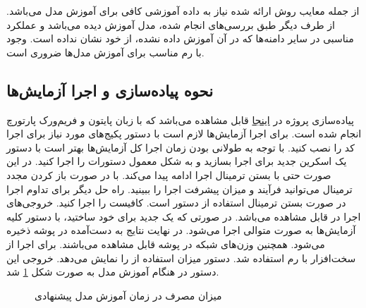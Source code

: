 از جمله معایب روش ارائه شده نیاز به داده آموزشی کافی برای آموزش مدل می‌باشد. از طرف دیگر طبق بررسی‌های انجام شده، مدل آموزش دیده
می‌باشد و عملکرد مناسبی در سایر دامنه‌ها که در آن آموزش داده نشده، از خود نشان نداده است. وجود 
با رم مناسب برای آموزش مدل‌ها ضروری است.



\subsection{نحوه پیاده‌سازی و اجرا آزمایش‌ها}
پیاده‌سازی پروژه در 
\href{https://github.com/ghazaleh-mahmoodi/Climate_Activism_Stance_Detection}{اینجا}
قابل مشاهده می‌باشد که با زبان پایتون و فریم‌ورک پارتورچ انجام شده است. برای اجرا آزمایش‌ها لازم است با دستور 
پکیج‌های مورد نیاز برای اجرا کد را نصب کنید. با توجه به طولانی بودن زمان اجرا کل آزمایش‌ها بهتر است با دستور 
یک اسکرین جدید برای اجرا بسازید و به شکل معمول دستورات را اجرا کنید. در این صورت حتی با بستن ترمینال اجرا ادامه پیدا می‌کند. با
در صورت باز کردن مجدد ترمینال می‌توانید فرآیند و میزان پیشرفت اجرا را ببینید.
راه حل دیگر برای تداوم اجرا در صورت بستن ترمینال استفاده از دستور 
است. کافیست
را اجرا کنید. خروجی‌های اجرا در 
قابل مشاهده می‌باشد.
\newline
در صورتی که یک
جدید برای خود ساختید، با دستور
کلیه آزمایش‌ها به صورت متوالی اجرا می‌شود. در نهایت نتایج به دست‌آمده در پوشه 
ذخیره می‌شود. همچنین وزن‌های شبکه در پوشه
قابل مشاهده می‌باشند.
\newline
برای اجرا از سخت‌افزار
با رم 
استفاده شد. دستور 
میزان استفاده از 
را نمایش می‌دهد. خروجی این دستور در هنگام آموزش مدل به صورت شکل \ref{nvidia-smi} شد.
\begin{figure}[H]		  		    			  	 
	\caption{میزان مصرف در زمان آموزش مدل پیشنهادی}
	\label{nvidia-smi}
\end{figure}

